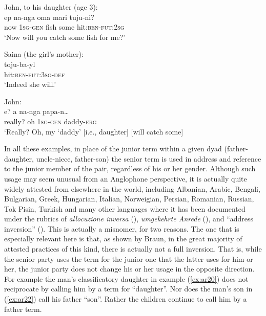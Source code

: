 \documentclass[output=paper]{langsci/langscibook}
\begin{document}
\begin{exe}
	\ex \label{ex:ar23}
	\begin{xlist}
	\ex John, to his daughter (age 3):\label{ex:ar23a}\\
	\gll ep na-nga oma mari tuju-ni?\\
	now 1\textsc{sg}-\textsc{gen} fish some hit:\textsc{ben}-\textsc{fut}:2\textsc{sg}\\
	\trans ‘Now will you catch some fish for me?’ 	
	
	\ex Saina (the girl’s mother):\label{ex:ar23b}\\
	\gll toju-ba-yl\\
	hit:\textsc{ben}-\textsc{fut}:3\textsc{sg}-\textsc{def}\\
	\trans ‘Indeed she will.’
	
	\ex John:\label{ex:ar23c}\\
	\gll e? a na-nga papa-n…\\
	really? oh 1\textsc{sg}-\textsc{gen} daddy-\textsc{erg}\\
	\trans ‘Really? Oh, my ‘daddy’ [i.e., daughter] [will catch some]
	\end{xlist}
\end{exe}

In all these examples, in place of the junior term within a given dyad (father-daughter, uncle-niece, father-son) the senior term is used in address and reference to the junior member of the pair, regardless of his or her gender. Although such usage may seem unusual from an Anglophone perspective, it is actually quite widely attested from elsewhere in the world, including Albanian, Arabic, Bengali, Bulgarian, Greek, Hungarian, Italian, Norweigian, Persian, Romanian, Russian, Tok Pisin, Turkish and many other languages where it has been documented under the rubrics of \textit{allocuzione inversa} (\citealt{Renzi1968}), \textit{umgekehrte Anrede} (\citealt{BeyerKostov1978}), and “address inversion” (\citealt{Braun1988}).  This is actually a misnomer, for two reasons.  The one that is especially relevant here is that, as shown by Braun, in the great majority of attested practices of this kind, there is actually not a full inversion. That is, while the senior party uses the term for the junior one that the latter uses for him or her, the junior party does not change his or her usage in the opposite direction. For example the man’s classificatory daughter in example (\ref{ex:ar20}) does not reciprocate by calling him by a term for “daughter”. Nor does the man’s son in (\ref{ex:ar22}) call his father “son”. Rather the children continue to call him by a father term. 
\end{document}
